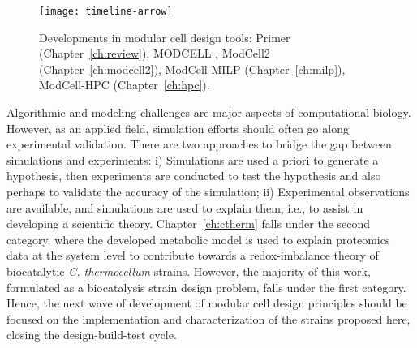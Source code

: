 \begin{figure}[h]
  \centering
  \texttt{[image: timeline-arrow]}
    \caption[Developments in modular cell design tools]{Developments in modular cell design tools: Primer (Chapter~\ref{ch:review}), MODCELL \citep{trinh2015}, ModCell2 (Chapter~\ref{ch:modcell2}), ModCell-MILP (Chapter~\ref{ch:milp}), ModCell-HPC (Chapter~\ref{ch:hpc}).}
    \label{fig8:arrow}
\end{figure}



Algorithmic and modeling challenges are major aspects of computational biology.
However, as an applied field, simulation efforts should often go along experimental validation.
There are two approaches to bridge the gap between simulations and experiments:
i) Simulations are used a priori to generate a hypothesis, then experiments are conducted to test the hypothesis and also perhaps to validate the accuracy of the simulation;
ii) Experimental observations are available, and simulations are used to explain them, i.e., to assist in developing a scientific theory.
Chapter~\ref{ch:ctherm} falls under the second category, where the developed metabolic model is used to explain proteomics data at the system level to contribute towards a redox-imbalance theory of biocatalytic \textit{C. thermocellum} strains. %
However, the majority of this work, formulated as a biocatalysis strain design problem, falls under the first category.
Hence, the next wave of development of modular cell design principles should be focused on the implementation and characterization of the strains proposed here, closing the design-build-test cycle.



